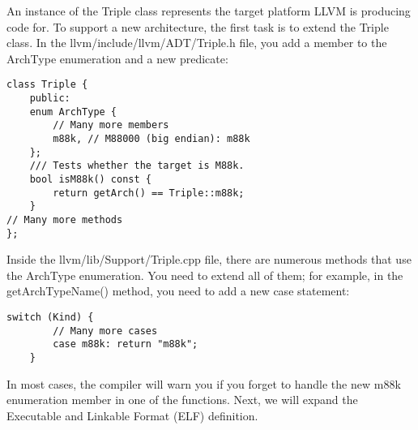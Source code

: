 An instance of the Triple class represents the target platform LLVM is producing code for. To support a new architecture, the first task is to extend the Triple class. In the llvm/include/llvm/ADT/Triple.h file, you add a member to the ArchType enumeration and a new predicate:\par

\begin{lstlisting}[caption={}]
class Triple {
	public:
	enum ArchType {
		// Many more members
		m88k, // M88000 (big endian): m88k
	};
	/// Tests whether the target is M88k.
	bool isM88k() const {
		return getArch() == Triple::m88k;
	}
// Many more methods
};
\end{lstlisting}

Inside the llvm/lib/Support/Triple.cpp file, there are numerous methods that use the ArchType enumeration. You need to extend all of them; for example, in the getArchTypeName() method, you need to add a new case statement:\par

\begin{lstlisting}[caption={}]
	switch (Kind) {
		// Many more cases
		case m88k: return "m88k";
	}
\end{lstlisting}

In most cases, the compiler will warn you if you forget to handle the new m88k enumeration member in one of the functions. Next, we will expand the Executable and Linkable Format (ELF) definition.\par




































